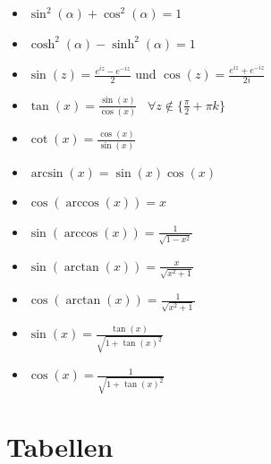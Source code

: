 \documentclass[8pt]{extarticle}
\begin{document}
\begin{multicols*}{3}
\begin{itemize}
 \item $\sin^2(\alpha) + \cos^2(\alpha) = 1$
 \item $\cosh^2(\alpha) - \sinh^2(\alpha) = 1$
 \item $\sin(z) = \frac{e^{iz} - e^{-iz}}{2}$ und $\cos(z) = \frac{e^{iz} + e^{-iz}}{2i}$
 \item $\tan(x) = \frac{\sin(x)}{\cos(x)} \;\;\; \forall z \not \in \{\frac{\pi}{2} + \pi k\}$
 \item $\cot(x) = \frac{\cos(x)}{\sin(x)}$
 \item $\arcsin(x) = \sin(x)\cos(x)$
 \item $\cos(\arccos(x)) = x$
 \item $\sin(\arccos(x)) = \frac{1}{\sqrt{1 - x^2}}$
 \item $\sin(\arctan(x)) = \frac{x}{\sqrt{x^2 + 1}}$
 \item $\cos(\arctan(x)) = \frac{1}{\sqrt{x^2 + 1}}$
 \item $\sin(x) = \frac{\tan(x)}{\sqrt{1 + \tan(x)^2}}$
 \item $\cos(x) = \frac{1}{\sqrt{1 + \tan(x)^2}}$

\end{itemize}

\section{Tabellen}

\end{multicols*}
\end{document}
